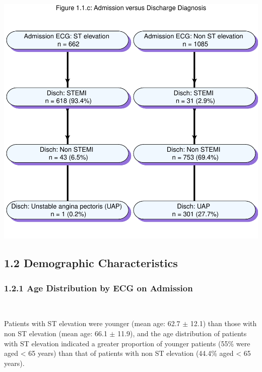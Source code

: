 \documentclass[
]{article}
\begin{document}
\includegraphics{‏‏ACSIS_2024_v1_pdf_without_files/figure-latex/unnamed-chunk-8-1.pdf}

\pagebreak

\subsection{1.2 Demographic
Characteristics}\label{demographic-characteristics}

\subsubsection{1.2.1 Age Distribution by ECG on
Admission}\label{age-distribution-by-ecg-on-admission}

~

Patients with ST elevation were younger (mean age: 62.7 \(\pm\) 12.1)
than those with non ST elevation (mean age: 66.1 \(\pm\) 11.9), and the
age distribution of patients with ST elevation indicated a greater
proportion of younger patients (55\% were aged \textless{} 65 years)
than that of patients with non ST elevation (44.4\% aged \textless{} 65
years).

~
\end{document}
